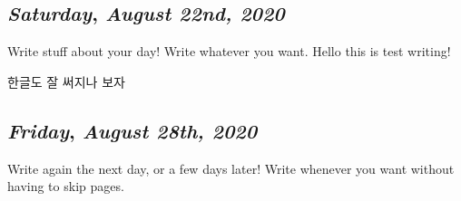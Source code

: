 \begin{center}
\section*{\month}
\end{center}

\def\day{\textit{August 22nd, 2020}}
\def\weekday{\textit{Saturday}}
\subsection*{\weekday, \day}

Write stuff about your day! Write whatever you want.
Hello this is test writing!

한글도 잘 써지나 보자

\def\day{\textit{August 28th, 2020}}
\def\weekday{\textit{Friday}}
\subsection*{\weekday, \day}

Write again the next day, or a few days later! Write whenever you want without having to skip pages.